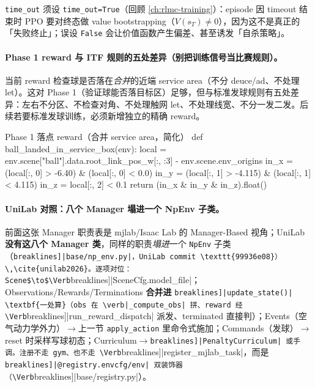 \verb|time_out| 须设 \verb|time_out=True|（回顾 \cref{ch:rlmc-training}）：episode 因 timeout 结束时 PPO 要对终态做 value bootstrapping（$V(s_T)\neq0$），因为这不是真正的「失败终止」；误设 \verb|False| 会让价值函数产生偏差、甚至诱发「自杀策略」。

\paragraph{Phase 1 reward 与 ITF 规则的五处差异（别把训练信号当比赛规则）。}当前 reward 检查球是否落在\emph{合并}的近端 service area（不分 deuce/ad、不处理 let）。这对 Phase 1（验证球能否落目标区）足够，但与标准发球规则有五处差异：左右不分区、不检查对角、不处理触网 let、不处理线宽、不分一发二发。后续若要标准发球训练，必须新增独立的精确 reward。

\begin{codebox}[Python]{Phase 1 落点 reward（合并 service area，简化）}
def ball_landed_in_service_box(env):
    local = env.scene["ball"].data.root_link_pos_w[:, :3] - env.scene.env_origins
    in_x = (local[:, 0] > -6.40) & (local[:, 0] < 0.0)
    in_y = (local[:, 1] > -4.115) & (local[:, 1] < 4.115)
    in_z = local[:, 2] < 0.1
    return (in_x & in_y & in_z).float()
\end{codebox}

\paragraph{UniLab 对照：八个 Manager 塌进一个 NpEnv 子类。}前面这张 Manager 职责表是 mjlab/Isaac Lab 的 Manager-Based 视角；UniLab \textbf{没有这八个 Manager 类}，同样的职责\emph{塌进}一个 \verb|NpEnv| 子类（\Verb[breaklines]|base/np_env.py|，UniLab commit \texttt{99936e08}）\,\cite{unilab2026}。逐项对位：Scene$\to$\Verb[breaklines]|SceneCfg.model_file|；Observations/Rewards/Terminations \textbf{合并进} \Verb[breaklines]|update_state()| \textbf{一处算}（obs 在 \verb|_compute_obs| 拼、reward 经 \Verb[breaklines]|run_reward_dispatch| 派发、terminated 直接判）；Events（空气动力学外力）$\to$上一节 \verb|apply_action| 里命令式施加；Commands（发球）$\to$ reset 时采样写球初态；Curriculum$\to$\Verb[breaklines]|PenaltyCurriculum| 或手调。注册不走 gym、也不走 \Verb[breaklines]|register_mjlab_task|，而是 \Verb[breaklines]|@registry.envcfg/env| 双装饰器（\Verb[breaklines]|base/registry.py|）。

